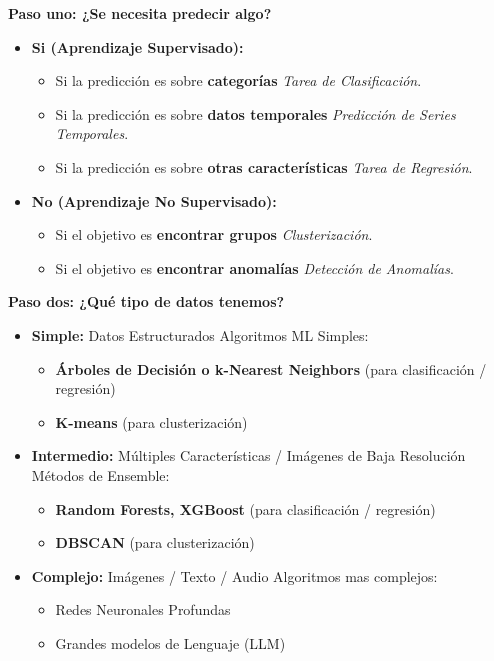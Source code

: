 \textbf{Paso uno: ¿Se necesita predecir algo?}
	\begin{itemize}
		\item \textbf{Si (Aprendizaje Supervisado):}
		\begin{itemize}
			\item Si la predicción es sobre \textbf{categorías} \textrightarrow \space \textit{Tarea de Clasificación}.
			\item Si la predicción es sobre \textbf{datos temporales} \textrightarrow \space \textit{Predicción de Series Temporales}.
			\item Si la predicción es sobre \textbf{otras características} \textrightarrow \space \textit{Tarea de Regresión}.
		\end{itemize}
		\item \textbf{No (Aprendizaje No Supervisado):}
		\begin{itemize}
			\item Si el objetivo es \textbf{encontrar grupos} \textrightarrow \space \textit{Clusterización}.
			\item Si el objetivo es \textbf{encontrar anomalías} \textrightarrow \space \textit{Detección de Anomalías}.
		\end{itemize}
	\end{itemize}
	
\textbf{Paso dos: ¿Qué tipo de datos tenemos?}
	\begin{itemize}
		\item \textbf{Simple:} Datos Estructurados \textrightarrow \space Algoritmos ML Simples:
		\begin{itemize}
			\item \textbf{Árboles de Decisión o k-Nearest Neighbors} (para clasificación / regresión)
			\item \textbf{K-means} (para clusterización)
		\end{itemize}
		\item \textbf{Intermedio:} Múltiples Características / Imágenes de Baja Resolución \textrightarrow \space Métodos de Ensemble:
		\begin{itemize}
			\item \textbf{ Random Forests, XGBoost }  (para clasificación / regresión)
			\item \textbf{DBSCAN} (para clusterización)
		\end{itemize}
		\item \textbf{Complejo:} Imágenes / Texto / Audio \textrightarrow \space Algoritmos mas complejos:
		\begin{itemize}
			\item Redes Neuronales Profundas
			\item Grandes modelos de Lenguaje (LLM)
		\end{itemize}
	\end{itemize}

